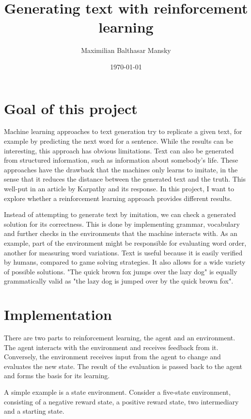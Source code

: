 \documentclass[a4paper, justified]{tufte-handout}
\title{Generating text with reinforcement learning}
\author{Maximilian Balthasar Mansky}
\date{\today}
\begin{document}
\maketitle

\section{Goal of this project}

Machine learning approaches to text generation try to replicate a given text, for example by predicting the next word for a sentence. While the results can be interesting, this approach has obvious limitations.\cite{Lau2020} Text can also be generated from structured information, such as information about somebody's life.\cite{lebret2020} These approaches have the drawback that the machines only learns to imitate, in the sense that it reduces the distance between the generated text and the truth. This well-put in an article by Karpathy\cite{karpathy2015} and its response\cite{goldberg2015}. In this project, I want to explore whether a reinforcement learning approach provides different results.

Instead of attempting to generate text by imitation, we can check a generated solution for its correctness. This is done by implementing grammar, vocabulary and further checks in the environments that the machine interacts with. As an example, part of the environment might be responsible for evaluating word order, another for measuring word variations. Text is useful because it is easily verified by humans, compared to game solving strategies. It also allows for a wide variety of possible solutions. "The quick brown fox jumps over the lazy dog" is equally grammatically valid as "the lazy dog is jumped over by the quick brown fox".

\section{Implementation}

There are two parts to reinforcement learning, the agent and an environment. The agent interacts with the environment and receives feedback from it. Conversely, the environment receives input from the agent to change and evaluates the new state. The result of the evaluation is passed back to the agent and forms the basis for its learning.

A simple example is a state environment. Consider a five-state environment, consisting of a negative reward state, a positive reward state, two intermediary and a starting state. 
\end{document}
